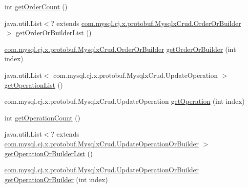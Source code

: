 \begin{DoxyCompactItemize}
\item 
int \mbox{\hyperlink{interfacecom_1_1mysql_1_1cj_1_1x_1_1protobuf_1_1_mysqlx_crud_1_1_update_or_builder_a993e6655766b61c4014b13c0ec71e3e2}{get\+Order\+Count}} ()
\item 
java.\+util.\+List$<$? extends \mbox{\hyperlink{interfacecom_1_1mysql_1_1cj_1_1x_1_1protobuf_1_1_mysqlx_crud_1_1_order_or_builder}{com.\+mysql.\+cj.\+x.\+protobuf.\+Mysqlx\+Crud.\+Order\+Or\+Builder}} $>$ \mbox{\hyperlink{interfacecom_1_1mysql_1_1cj_1_1x_1_1protobuf_1_1_mysqlx_crud_1_1_update_or_builder_ac6e9b7186ce85a9acddb6c06b9a60463}{get\+Order\+Or\+Builder\+List}} ()
\item 
\mbox{\hyperlink{interfacecom_1_1mysql_1_1cj_1_1x_1_1protobuf_1_1_mysqlx_crud_1_1_order_or_builder}{com.\+mysql.\+cj.\+x.\+protobuf.\+Mysqlx\+Crud.\+Order\+Or\+Builder}} \mbox{\hyperlink{interfacecom_1_1mysql_1_1cj_1_1x_1_1protobuf_1_1_mysqlx_crud_1_1_update_or_builder_acc105ab7c3e803dc1f7ec209f08bea9c}{get\+Order\+Or\+Builder}} (int index)
\item 
java.\+util.\+List$<$ com.\+mysql.\+cj.\+x.\+protobuf.\+Mysqlx\+Crud.\+Update\+Operation $>$ \mbox{\hyperlink{interfacecom_1_1mysql_1_1cj_1_1x_1_1protobuf_1_1_mysqlx_crud_1_1_update_or_builder_ab39bf58e6447ba69a8c0e51fee7c4a83}{get\+Operation\+List}} ()
\item 
com.\+mysql.\+cj.\+x.\+protobuf.\+Mysqlx\+Crud.\+Update\+Operation \mbox{\hyperlink{interfacecom_1_1mysql_1_1cj_1_1x_1_1protobuf_1_1_mysqlx_crud_1_1_update_or_builder_a0f1cfd0604e855c5616254503ec2219a}{get\+Operation}} (int index)
\item 
int \mbox{\hyperlink{interfacecom_1_1mysql_1_1cj_1_1x_1_1protobuf_1_1_mysqlx_crud_1_1_update_or_builder_ad989e653a1bcb4e61e2d02276b8aa406}{get\+Operation\+Count}} ()
\item 
java.\+util.\+List$<$? extends \mbox{\hyperlink{interfacecom_1_1mysql_1_1cj_1_1x_1_1protobuf_1_1_mysqlx_crud_1_1_update_operation_or_builder}{com.\+mysql.\+cj.\+x.\+protobuf.\+Mysqlx\+Crud.\+Update\+Operation\+Or\+Builder}} $>$ \mbox{\hyperlink{interfacecom_1_1mysql_1_1cj_1_1x_1_1protobuf_1_1_mysqlx_crud_1_1_update_or_builder_aa4f15e97c63db0c6c1f3bfe00c06e93b}{get\+Operation\+Or\+Builder\+List}} ()
\item 
\mbox{\hyperlink{interfacecom_1_1mysql_1_1cj_1_1x_1_1protobuf_1_1_mysqlx_crud_1_1_update_operation_or_builder}{com.\+mysql.\+cj.\+x.\+protobuf.\+Mysqlx\+Crud.\+Update\+Operation\+Or\+Builder}} \mbox{\hyperlink{interfacecom_1_1mysql_1_1cj_1_1x_1_1protobuf_1_1_mysqlx_crud_1_1_update_or_builder_ab49e98ea10319dcfb7432df304d45b69}{get\+Operation\+Or\+Builder}} (int index)
\end{DoxyCompactItemize}


